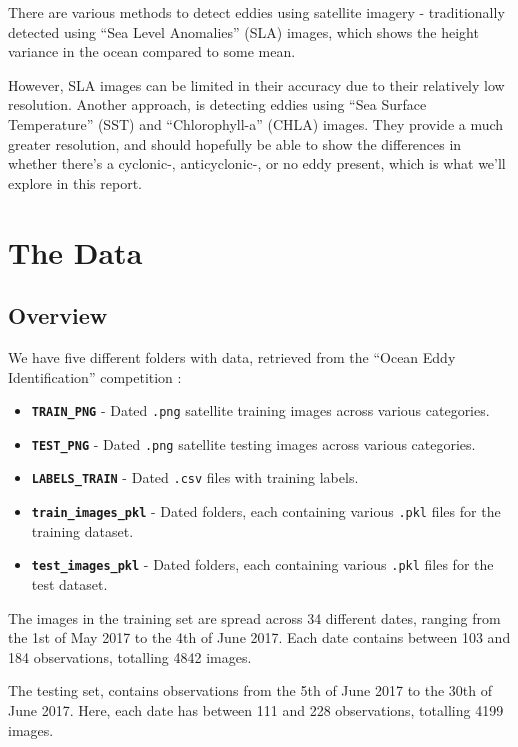 \documentclass[12pt,a4paper,english]{article}
\begin{document}
    There are various methods to detect eddies using satellite imagery - traditionally detected using ``Sea Level Anomalies'' (SLA) images, which
    shows the height variance in the ocean compared to some mean.
    
    However, SLA images can be limited in their accuracy due to their relatively low resolution.
    Another approach, is detecting eddies using ``Sea Surface Temperature'' (SST) and ``Chlorophyll-a'' (CHLA) images.
    They provide a much greater resolution, and should hopefully be able to show the differences in whether there's a cyclonic-, anticyclonic-, or no eddy present, which is what we'll explore in this report.

    \section{The Data}

    \subsection{Overview}

    We have five different folders with data, retrieved from the ``Ocean Eddy Identification'' competition \cite{data:mercatorocean}:
    \begin{itemize} %
        \item[] \texttt{\textbf{TRAIN\_PNG}} - Dated \verb|.png| satellite training images across various categories.
        \item[] \texttt{\textbf{TEST\_PNG}} - Dated \verb|.png| satellite testing images across various categories.
        \item[] \texttt{\textbf{LABELS\_TRAIN}} - Dated \verb|.csv| files with training labels.
        \item[] \texttt{\textbf{train\_images\_pkl}} - Dated folders, each containing various \verb|.pkl| files for the training dataset.
        \item[] \texttt{\textbf{test\_images\_pkl}} - Dated folders, each containing various \verb|.pkl| files for the test dataset.
    \end{itemize}

    The images in the training set are spread across 34 different dates, ranging from the 1st of May 2017 to the 4th of June 2017.
    Each date contains between 103 and 184 observations, totalling 4842 images.
    
    The testing set, contains observations from the 5th of June 2017 to the 30th of June 2017.
    Here, each date has between 111 and 228 observations, totalling 4199 images.
    
\end{document}

